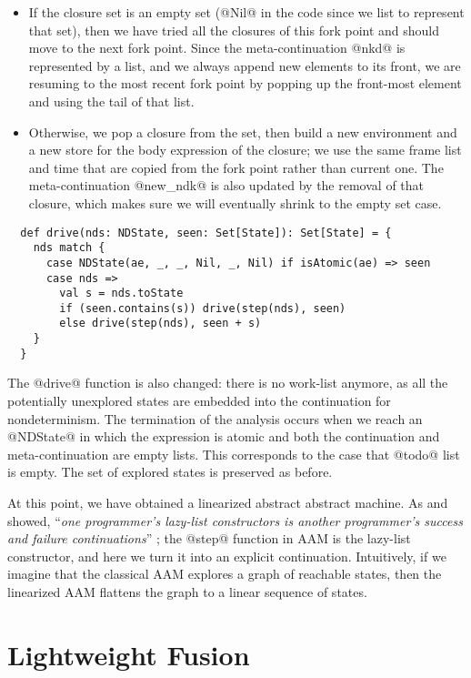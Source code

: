 \documentclass[acmsmall, review]{acmart}\settopmatter{}
\begin{document}
\begin{itemize}
  \item If the closure set is an empty set (@Nil@ in the code since we list to represent that set),
then we have tried all the closures of this fork point and should move to the
next fork point. Since the meta-continuation @nkd@ is represented by a list, and we always
append new elements to its front, we are resuming to the most recent fork point by
popping up the front-most element and using the tail of that list.
  \item Otherwise, we pop a closure from the set, then build a new
environment and a new store for the body expression of the closure;
we use the same frame list and time that are copied from the fork point rather
than current one.
The meta-continuation @new_ndk@ is also updated by the removal of that closure, which makes
sure we will eventually shrink to the empty set case.
\end{itemize}

\begin{lstlisting}
  def drive(nds: NDState, seen: Set[State]): Set[State] = {
    nds match {
      case NDState(ae, _, _, Nil, _, Nil) if isAtomic(ae) => seen
      case nds =>
        val s = nds.toState
        if (seen.contains(s)) drive(step(nds), seen)
        else drive(step(nds), seen + s)
    }
  }
\end{lstlisting}

The @drive@ function is also changed: there is no work-list anymore, as all the
potentially unexplored states are embedded into the continuation for
nondeterminism.
The termination of the analysis occurs when we reach an @NDState@ in which the expression
is atomic and both the continuation and meta-continuation are empty lists. This corresponds 
to the case that @todo@ list is empty. The set of explored states is preserved as before.

At this point, we have obtained a linearized abstract abstract machine. 
As \citeauthor{10.1007/3-540-15975-4_33} and \citeauthor{danvy2006a} 
showed, ``\textit{one programmer’s lazy-list constructors is another programmer’s success 
and failure continuations}'' \cite{10.1007/3-540-15975-4_33, danvy2006a}; the @step@ function
in AAM is the lazy-list constructor, and here we turn it into an explicit continuation.
Intuitively, if we imagine that the classical AAM explores a graph of reachable states, 
then the linearized AAM flattens the graph to a linear sequence of states.

\section{Lightweight Fusion} \label{fusing}
\end{document}
